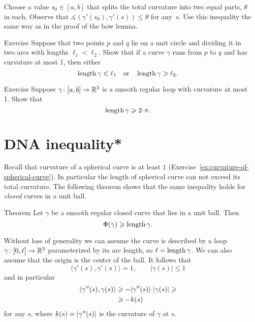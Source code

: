 Choose a value $s_0\in[a,b]$ that splits the total curvature into two equal parts, $\theta$ in each.
Observe that $\measuredangle(\gamma'(s_0),\gamma'(s))\le \theta$ for any~$s$.
Use this inequality the same way as in the proof of the bow lemma.

\begin{thm}{Exercise}\label{ex:schwartz}
Suppose that two points $p$ and $q$ lie on a unit circle and dividing it in two arcs with lengths $\ell_1<\ell_2$.
Show that if a curve $\gamma$ runs from $p$ to $q$ and has curvature at most 1,
then either
\[\mathop{\rm length}\nolimits \gamma\leqslant \ell_1
\quad\text{or}\quad
\mathop{\rm length}\nolimits \gamma\geqslant \ell_2.
\]
\end{thm} %

\begin{thm}{Exercise}\label{ex:loop}
Suppose $\gamma\colon[a,b]\to \mathbb{R}^3$ is a smooth regular loop with curvature at most 1.
Show that 
\[\length\gamma\ge2\cdot\pi.\]

\end{thm}


\section*{DNA inequality*}

Recall that curvature of a spherical curve is at least $1$
(Exercise~\ref{ex:curvature-of-spherical-curve}).
In particular the length of spherical curve can not exceed its total curvature.
The following theorem shows that the same inequality holds for \emph{closed} curves in a unit ball.

\begin{thm}{Theorem}\label{thm:DNA}
Let $\gamma$ be a smooth regular closed curve that lies in a unit ball.
Then 
\[\Phi({\gamma})\geqslant \mathop{\rm length}\nolimits\gamma.\]

\end{thm}

Without loss of generality we can assume the curve is described by a loop $\gamma\colon[0,\ell]\to\mathbb{R}^3$ parameterized by its arc length, so $\ell=\mathop{\rm length}\nolimits\gamma$.
We can also assume that the origin is the center of the ball.
It follows that
\[\langle\gamma'(s),\gamma'(s)\rangle=1,\qquad |\gamma(s)|\le 1\]
and in particular 
\begin{align*}
\langle\gamma''(s),\gamma(s)\rangle&\ge -|\gamma''(s)|\cdot|\gamma(s)|\ge
\\
&\ge-\kur(s)
\end{align*}
for any $s$, where $k(s)=|\gamma''(s)|$ is the curvature of $\gamma$ at $s$.

